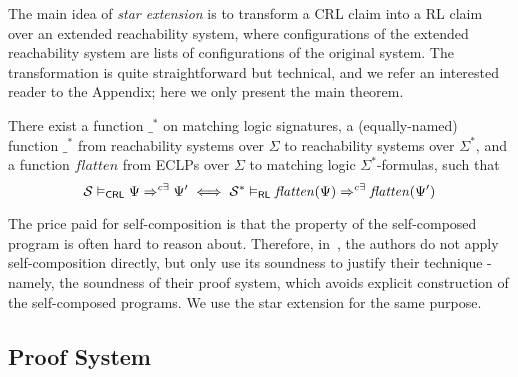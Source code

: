 The main idea of \emph{star extension} is to transform a CRL claim into a RL claim over an extended reachability system,
where configurations of the extended reachability system are lists of configurations of the original system.
The transformation is quite straightforward but technical, and we refer an interested reader to the Appendix;
here we only present the main theorem.
\begin{theorem}\label{thm:CRLandRLcorrespondence}
  There exist a function $\_^*$ on matching logic signatures,
  a (equally-named) function $\_^*$ from reachability systems over $\Sigma$ to reachability systems over $\Sigma^*$,
  and a function $\mathit{flatten}$ from ECLPs over $\Sigma$ to matching logic $\Sigma^*$-formulas,
  such that
  \begin{equation*}
  \mathcal{S} \vDash_{\mathsf{CRL}} \Psi \Rightarrow^{c\exists} \Psi^\prime
    \iff \mathcal{S}^* \vDash_{\mathsf{RL}} \mathit{flatten}(\Psi) \Rightarrow^{c\exists} \mathit{flatten}(\Psi^\prime)
  \end{equation*}
\end{theorem}

The price paid for self-composition is that the property of the self-composed program is often hard to reason about.
Therefore, in~\cite{SousaD16}, the authors do not apply self-composition directly, but only use its soundness to justify
their technique - namely, the soundness of their proof system, which avoids explicit construction
of the self-composed programs.
We use the star extension for the same purpose.



\subsection{Proof System}






